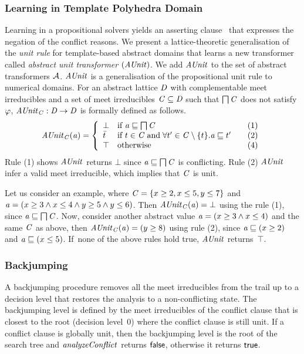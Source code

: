 \subsubsection{Learning in Template Polyhedra Domain}
Learning in a propositional solvers yields an asserting
clause~\cite{cdcl} that expresses the negation of the conflict
reasons.  We present a lattice-theoretic generalisation of the 
{\em unit rule} for template-based abstract domains that learns a new 
transformer called {\em abstract unit transformer} $(\mathit{AUnit})$.    
We add $\mathit{AUnit}$ to the set of abstract transformers $\mathcal{A}$. 
$\mathit{AUnit}$ is a generalisation of the propositional unit rule to
numerical domains.  For an abstract lattice $\mathit{D}$ with
complementable meet irreducibles and a set of meet irreducibles $\mathit{C}
\subseteq \mathit{D}$ such that $\bigsqcap
\mathit{C}$ does not satisfy $\varphi$, $\mathit{AUnit}_{\mathit{C}}: \mathit{D} \rightarrow
\mathit{D}$ is formally defined as follows.
\[ \aunit_\conflictset(\absval) =
 \left\{\begin{array}{l@{\quad}l@{\qquad}l}
  \bot       & \text{if } \absval \sqsubseteq \bigsqcap \conflictset & (1)\\
  \bar{t}    & \text{if } t \in \conflictset \; \text{and} \; \forall t' \in \conflictset
  \setminus \{t\}. \absval  \sqsubseteq t' & (2) \\
  \top & \text{otherwise} & (4) \\
 \end{array}\right.
\]
Rule (1) shows $\mathit{AUnit}$ returns $\bot$ since 
$\mathit{a} \sqsubseteq \bigsqcap \mathit{C}$ is conflicting.  
Rule (2) $\mathit{AUnit}$ infer a valid meet irreducible, 
which implies that $\mathit{C}$ is unit.

%
Let us consider an example, where $\mathit{C} = \{x \geq 2, x \leq 5, y
\leq 7 \}$ and $\mathit{a} = (x \geq 3\wedge\allowbreak x \leq
4\wedge\allowbreak y \geq 5\wedge y \leq 6)$.  Then
$\mathit{AUnit}_{\mathit{C}}(\mathit{a}) = \bot$ using the rule (1), since $\mathit{a}
\sqsubseteq \bigsqcap\mathit{C}$.  Now, consider another abstract value
$\mathit{a} = (x \geq 3\wedge x \leq 4)$ and the same $\mathit{C}$ as above,
then $\mathit{AUnit}_{\mathit{C}}(\mathit{a}) = (y \geq 8)$ using rule (2), since
$\mathit{a} \sqsubseteq (x \geq 2)$ and $\mathit{a} \sqsubseteq (x \leq 5)$.  
If~none of the above rules hold true, $\mathit{AUnit}$ returns~$\top$.
%
\subsubsection{Backjumping}
A backjumping procedure removes all the meet irreducibles from 
the trail up to a decision level that restores the analysis to a
non-conflicting state.  The backjumping level is defined by the
meet irreducibles of the conflict clause that is closest 
to the root (decision level~0) where the conflict
clause is still unit.  If a conflict clause is globally unit, then the
backjumping level is the root of the search tree and
$\mathit{analyzeConflict}$ returns $\mathsf{false}$, otherwise it returns $\mathsf{true}$.

